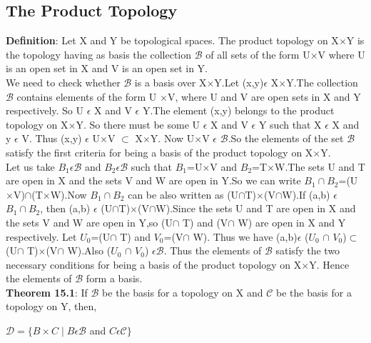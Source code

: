 \documentclass[a4paper,english,12pt]{article}
\begin{document}
\begin{defn}
\section{The Product Topology}
{\bf Definition}: Let X and Y be topological spaces. The product topology on X$\times$Y is the topology having as basis the collection $\mathscr{B}$ of all sets of the form U$\times$V where U is an open set in X and V is an open set in Y.\\
\vspace{1mm}
We need to check whether $\mathscr{B}$ is a basis over X$\times$Y.Let (x,y)$\epsilon$ X$\times$Y.The collection $\mathscr{B}$ contains elements of the form U $\times$V, where U and V are open sets in X and Y respectively. So U $\epsilon$ X and V $\epsilon$ Y.The element (x,y) belongs to the product topology on X$\times$Y. So there must be some U $\epsilon$ X and V $\epsilon$ Y such that X $\epsilon$ X and y $\epsilon$ V. Thus (x,y) $\epsilon$ U$\times$V $\subset$ X$\times$Y. Now U$\times$V $\epsilon$ $\mathscr{B}$.So the elements of the set $\mathscr{B}$ satisfy the first criteria for being a basis of the product topology on  X$\times$Y.\\
\vspace{1mm}
Let us take $B{_1}\epsilon\mathscr{B}$ and $B{_2}\epsilon\mathscr{B}$ such that $B{_1}$=U$\times$V and $B{_2}$=T$\times$W.The sets U and T are open in X and the sets V and W are open in Y.So we can write $B{_1}\cap B{_2}$=(U$\times$V)$\cap $(T$\times$W).Now $B{_1}\cap B{_2}$ can be also written as (U$\cap $T)$\times $(V$\cap $W).If (a,b) $\epsilon$ $B{_1}\cap B{_2}$, then (a,b) $\epsilon$ (U$\cap $T)$\times $(V$\cap $W).Since the sets
U and T are open in X and the sets V and W are open in Y,so (U$\cap$ T) and (V$\cap$ W) are open in X and Y respectively. Let $U_0$=(U$\cap$ T) and $V_0$=(V$\cap$ W). Thus we have (a,b)$\epsilon$ ($U_0$ $\cap $ $V_0$)$\subset$ (U$\cap$ T)$\times $(V$\cap$ W).Also ($U_0$ $\cap$ $V_0$) $\epsilon \mathscr{B}$. Thus the elements of $\mathscr{B}$ satisfy the two necessary conditions for being a basis of the product topology on X$\times$Y. Hence the elements of $\mathscr{B}$ form a basis.\\
\vspace{2mm}
{\bf Theorem 15.1}: If $\mathscr{B}$ be the basis for a topology on X and $\mathscr{C}$ be the basis for a topology on Y, then,\\
\vspace{1mm}
\begin{center}
$\mathscr{D}=\{B\times C\mid B \epsilon \mathscr{B}$ and $C \epsilon \mathscr{C}\}$\\

\end{center}
\end{defn}
\end{document}
